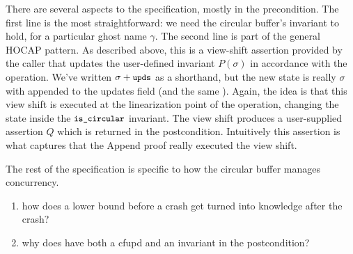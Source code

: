 There are several aspects to the specification, mostly in the precondition. The
first line is the most straightforward: we need the circular buffer's invariant
to hold, for a particular ghost name $\gamma$. The second line is part of the
general HOCAP pattern. As described above, this is a view-shift assertion
provided by the caller that updates the user-defined invariant $P(\sigma)$ in
accordance with the  operation. We've written $\sigma + \cc{upds}$ as
a shorthand, but the new state is really $\sigma$ with  appended to the
updates field (and the same ). Again, the idea is that this view shift
is executed at the linearization point of the  operation, changing
the state inside the $\cc{is_circular}$ invariant. The view shift produces a
user-supplied assertion $Q$ which is returned in the postcondition. Intuitively
this assertion is what captures that the Append proof really executed the view
shift. 

The rest of the specification is specific to how the circular buffer manages
concurrency.

\begin{enumerate}
  \item how does a lower bound before a crash get turned into knowledge after
  the crash?
  \item why does  have both a cfupd and an invariant in
  the postcondition?
\end{enumerate}

\resume
